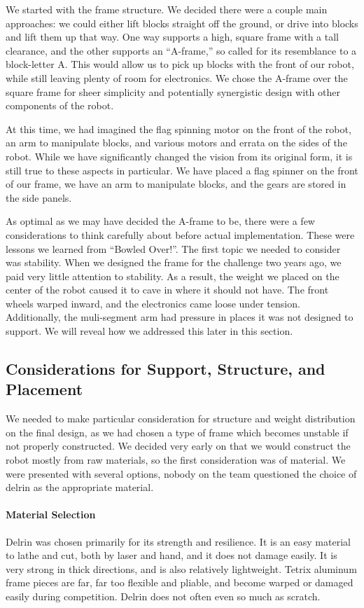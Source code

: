 \documentclass{article}
\begin{document}
We started with the frame structure. We decided there were a couple main approaches: we could either lift blocks straight off the ground, or drive into blocks and lift them up that way. One way supports a high, square frame with a tall clearance, and the other supports an ``A-frame,'' so called for its resemblance to a block-letter A. This would allow us to pick up blocks with the front of our robot, while still leaving plenty of room for electronics. We chose the A-frame over the square frame for sheer simplicity and potentially synergistic design with other components of the robot. 

At this time, we had imagined the flag spinning motor on the front of the robot, an arm to manipulate blocks, and various motors and errata on the sides of the robot. While we have significantly changed the vision from its original form, it is still true to these aspects in particular. We have placed a flag spinner on the front of our frame, we have an arm to manipulate blocks, and the gears are stored in the side panels. 

As optimal as we may have decided the A-frame to be, there were a few considerations to think carefully about before actual implementation. These were lessons we learned from ``Bowled Over!''. The first topic we needed to consider was stability. When we designed the frame for the challenge two years ago, we paid very little attention to stability. As a result, the weight we placed on the center of the robot caused it to cave in where it should not have. The front wheels warped inward, and the electronics came loose under tension. Additionally, the muli-segment arm had pressure in places it was not designed to support. We will reveal how we addressed this later in this section.

\newpage \subsection{Considerations for Support, Structure, and Placement}
We needed to make particular consideration for structure and weight distribution on the final design, as we had chosen a type of frame which becomes unstable if not properly constructed. We decided very early on that we would construct the robot mostly from raw materials, so the first consideration was of material. We were presented with several options, nobody on the team questioned the choice of delrin as the appropriate material.

\paragraph{Material Selection} Delrin was chosen primarily for its strength and resilience. It is an easy material to lathe and cut, both by laser and hand, and it does not damage easily. It is very strong in thick directions, and is also relatively lightweight. Tetrix aluminum frame pieces are far, far too flexible and pliable, and become warped or damaged easily during competition. Delrin does not often even so much as scratch.
\end{document}
